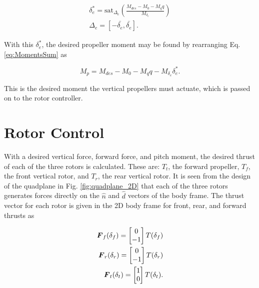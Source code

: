 \begin{align}
    \label{eq:saturateDeltaE}
    \delta_e^\ast = \text{sat}_{\Delta_e}\left(\frac{M_{des} - M_0 - M_q q}{M_{\delta_e}}\right) \\
    \Delta_e = [-\bar{\delta_e},\bar{\delta_e}].
\end{align}

With this $\delta_e^\ast$, the desired propeller moment may be found by rearranging Eq. \ref{eq:MomentsSum} as

\begin{equation}
    M_p = M_{des} - M_0 - M_q q - M_{\delta_e} \delta_e^\ast.
\end{equation}

This is the desired moment the vertical propellers must actuate, which is passed on to the rotor controller.

\section{Rotor Control}

With a desired vertical force, forward force, and pitch moment, the desired thrust of each of the three rotors is calculated.
These are: $T_t$, the forward propeller, $T_f$, the front vertical rotor, and $T_r$, the rear vertical rotor.
It is seen from the design of the quadplane in Fig. \ref{fig:quadplane_2D} that each of the three rotors generates forces directly on the $\hat{n}$ and $\hat{d}$ vectors of the body frame. 
The thrust vector for each rotor is given in the 2D body frame for front, rear, and forward thrusts as

\begin{align}
    \label{eq:thrustDirections}
    \boldsymbol{F}_f(\delta_f) = 
    \begin{bmatrix}
        0\\
        -1\\
    \end{bmatrix}
    \space T(\delta_f)\\
    \boldsymbol{F}_r(\delta_r) = 
    \begin{bmatrix}
        0\\
        -1\\
    \end{bmatrix}
    \space T(\delta_r)\\
    \boldsymbol{F}_t(\delta_t) = 
    \begin{bmatrix}
        1\\
        0\\
    \end{bmatrix}
    \space T(\delta_t).
\end{align}

